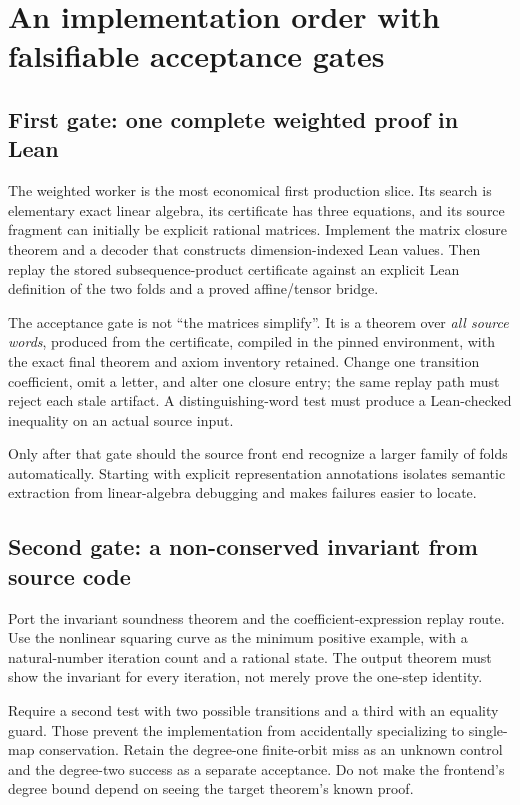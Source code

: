 \section{An implementation order with falsifiable acceptance gates}
\label{sec:roadmap}

\subsection{First gate: one complete weighted proof in Lean}

The weighted worker is the most economical first production slice. Its search
is elementary exact linear algebra, its certificate has three equations, and
its source fragment can initially be explicit rational matrices. Implement the
matrix closure theorem and a decoder that constructs dimension-indexed Lean
values. Then replay the stored subsequence-product certificate against an
explicit Lean definition of the two folds and a proved affine/tensor bridge.

The acceptance gate is not ``the matrices simplify''. It is a theorem over
\emph{all source words}, produced from the certificate, compiled in the pinned
environment, with the exact final theorem and axiom inventory retained. Change
one transition coefficient, omit a letter, and alter one closure entry; the
same replay path must reject each stale artifact. A distinguishing-word test
must produce a Lean-checked inequality on an actual source input.

Only after that gate should the source front end recognize a larger family of
folds automatically. Starting with explicit representation annotations isolates
semantic extraction from linear-algebra debugging and makes failures easier to
locate.

\subsection{Second gate: a non-conserved invariant from source code}

Port the invariant soundness theorem and the coefficient-expression replay
route. Use the nonlinear squaring curve as the minimum positive example, with
a natural-number iteration count and a rational state. The output theorem must
show the invariant for every iteration, not merely prove the one-step identity.

Require a second test with two possible transitions and a third with an equality
guard. Those prevent the implementation from accidentally specializing to
single-map conservation. Retain the degree-one finite-orbit miss as an unknown
control and the degree-two success as a separate acceptance. Do not make the
frontend's degree bound depend on seeing the target theorem's known proof.

